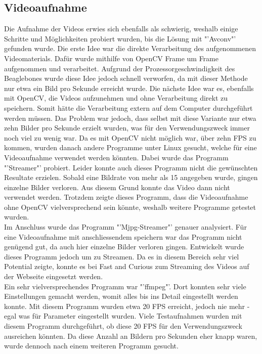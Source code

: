 \subsection{Videoaufnahme}
Die Aufnahme der Videos erwies sich ebenfalls als schwierig, weshalb einige Schritte und Möglichkeiten probiert wurden, bis die Lösung mit "'Avconv"' gefunden wurde. Die erste Idee war die direkte Verarbeitung des aufgenommenen Videomaterials. Dafür wurde mithilfe von OpenCV Frame um Frame aufgenommen und verarbeitet. Aufgrund der Prozessorgeschwindigkeit des Beaglebones wurde diese Idee jedoch schnell verworfen, da mit dieser Methode nur etwa ein Bild pro Sekunde erreicht wurde. Die nächste Idee war es, ebenfalls mit OpenCV, die Videos aufzunehmen und ohne Verarbeitung direkt zu speichern. Somit hätte die Verarbeitung extern auf dem Computer durchgeführt werden müssen. Das Problem war jedoch, dass selbst mit diese Variante nur etwa zehn Bilder pro Sekunde erzielt wurden, was für den Verwendungszweck immer noch viel zu wenig war. Da es mit OpenCV nicht möglich war, über zehn FPS zu kommen, wurden danach andere Programme unter Linux gesucht, welche für eine Videoaufnahme verwendet werden könnten. Dabei wurde das Programm "'Streamer"' probiert. Leider konnte auch dieses Programm nicht die gewünschten Resultate erzielen. Sobald eine Bildrate von mehr als 15 angegeben wurde, gingen einzelne Bilder verloren. Aus diesem Grund konnte das Video dann nicht verwendet werden. Trotzdem zeigte dieses Programm, dass die Videoaufnahme ohne OpenCV vielversprechend sein könnte, weshalb weitere Programme getestet wurden. \cite{Streamer}\\
Im Anschluss wurde das Programm "'Mjpg-Streamer"' genauer analysiert. Für eine Videoaufnahme mit anschliessendem speichern war das Programm nicht genügend gut, da auch hier einzelne Bilder verloren gingen. Entwickelt wurde dieses Programm jedoch um zu Streamen. Da es in diesem Bereich sehr viel Potential zeigte, konnte es bei Fast and Curious zum Streaming des Videos auf der Webseite eingesetzt werden. \cite{MjpgStreamer} \\
Ein sehr vielversprechendes Programm war "'ffmpeg"'. Dort konnten sehr viele Einstellungen gemacht werden, womit alles bis ins Detail eingestellt werden konnte. Mit diesem Programm wurden etwa 20 FPS erreicht, jedoch nie mehr - egal was für Parameter eingestellt wurden. Viele Testaufnahmen wurden mit diesem Programm durchgeführt, ob diese 20 FPS für den Verwendungszweck ausreichen könnten. Da diese Anzahl an Bildern pro Sekunden eher knapp waren, wurde dennoch nach einem weiteren Programm gesucht. \cite{Ffmpeg} \\
